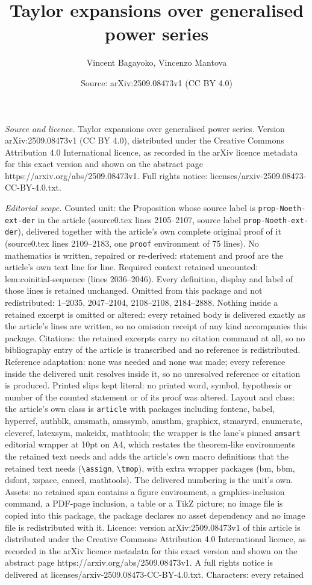 \documentclass[10pt,a4paper]{amsart}
\title[Taylor expansions over generalised power series]{Taylor expansions over generalised power series}
\author{Vincent Bagayoko, Vincenzo Mantova}
\date{Source: arXiv:2509.08473v1 (CC BY 4.0)}
\begin{document}
\maketitle

\noindent\emph{Source and licence.} Taylor expansions over generalised power series. Version arXiv:2509.08473v1 (CC BY 4.0), distributed under the Creative Commons Attribution 4.0 International licence, as recorded in the arXiv licence metadata for this exact version and shown on the abstract page https://arxiv.org/abs/2509.08473v1. Full rights notice: licenses/arxiv-2509.08473-CC-BY-4.0.txt.\par\smallskip

\noindent\textit{Editorial scope.} Counted unit: the Proposition whose source label is \texttt{prop-Noeth-ext-der} in the article (source0.tex lines 2105--2107, source label \texttt{prop-Noeth-ext-der}), delivered together with the article's own complete original proof of it (source0.tex lines 2109--2183, one \texttt{proof} environment of 75 lines). No mathematics is written, repaired or re-derived: statement and proof are the article's own text line for line. Required context retained uncounted: lem:coinitial-sequence (lines 2036--2046). Every definition, display and label of those lines is retained unchanged. Omitted from this package and not redistributed: 1--2035, 2047--2104, 2108--2108, 2184--2888. Nothing inside a retained excerpt is omitted or altered: every retained body is delivered exactly as the article's lines are written, so no omission receipt of any kind accompanies this package. Citations: the retained excerpts carry no citation command at all, so no bibliography entry of the article is transcribed and no reference is redistributed. Reference adaptation: none was needed and none was made; every reference inside the delivered unit resolves inside it, so no unresolved reference or citation is produced. Printed slips kept literal: no printed word, symbol, hypothesis or number of the counted statement or of its proof was altered. Layout and class: the article's own class is \texttt{article} with packages including fontenc, babel, hyperref, authblk, amsmath, amssymb, amsthm, graphicx, stmaryrd, enumerate, cleveref, latexsym, makeidx, mathtools; the wrapper is the lane's pinned \texttt{amsart} editorial wrapper at 10pt on A4, which restates the theorem-like environments the retained text needs and adds the article's own macro definitions that the retained text needs (\texttt{\textbackslash assign}, \texttt{\textbackslash tmop}), with extra wrapper packages (bm, bbm, dsfont, xspace, cancel, mathtools). The delivered numbering is the unit's own. Assets: no retained span contains a figure environment, a graphics-inclusion command, a PDF-page inclusion, a table or a TikZ picture; no image file is copied into this package, the package declares no asset dependency and no image file is redistributed with it. Licence: version arXiv:2509.08473v1 of this article is distributed under the Creative Commons Attribution 4.0 International licence, as recorded in the arXiv licence metadata for this exact version and shown on the abstract page https://arxiv.org/abs/2509.08473v1. A full rights notice is delivered at licenses/arxiv-2509.08473-CC-BY-4.0.txt. Characters: every retained 
\end{document}

